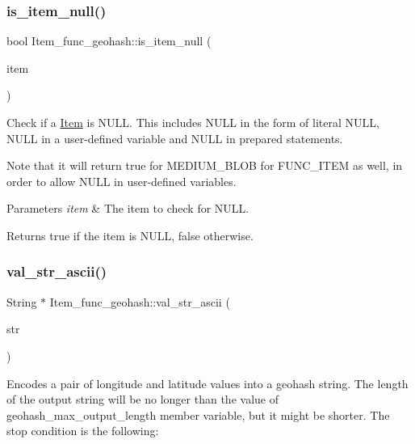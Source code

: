 \subsubsection{\texorpdfstring{is\+\_\+item\+\_\+null()}{is\_item\_null()}}
{\footnotesize\ttfamily bool Item\+\_\+func\+\_\+geohash\+::is\+\_\+item\+\_\+null (\begin{DoxyParamCaption}\item[{\mbox{\hyperlink{classItem}{Item}} $\ast$}]{item }\end{DoxyParamCaption})\hspace{0.3cm}{\ttfamily [static]}}

Check if a \mbox{\hyperlink{classItem}{Item}} is N\+U\+LL. This includes N\+U\+LL in the form of literal N\+U\+LL, N\+U\+LL in a user-\/defined variable and N\+U\+LL in prepared statements.

Note that it will return true for M\+E\+D\+I\+U\+M\+\_\+\+B\+L\+OB for F\+U\+N\+C\+\_\+\+I\+T\+EM as well, in order to allow N\+U\+LL in user-\/defined variables.


\begin{DoxyParams}{Parameters}
{\em item} & The item to check for N\+U\+LL.\\
\hline
\end{DoxyParams}
\begin{DoxyReturn}{Returns}
true if the item is N\+U\+LL, false otherwise. 
\end{DoxyReturn}
\mbox{\label{classItem__func__geohash_a460112e8fbbf5494c4a6cbf969f87013}} 
\subsubsection{\texorpdfstring{val\+\_\+str\+\_\+ascii()}{val\_str\_ascii()}}
{\footnotesize\ttfamily String $\ast$ Item\+\_\+func\+\_\+geohash\+::val\+\_\+str\+\_\+ascii (\begin{DoxyParamCaption}\item[{String $\ast$}]{str }\end{DoxyParamCaption})\hspace{0.3cm}{\ttfamily [virtual]}}

Encodes a pair of longitude and latitude values into a geohash string. The length of the output string will be no longer than the value of geohash\+\_\+max\+\_\+output\+\_\+length member variable, but it might be shorter. The stop condition is the following\+:

